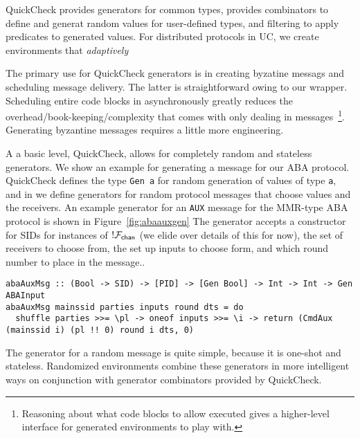QuickCheck provides generators for common types, provides combinators to define and generat random values for user-defined types, and filtering to apply predicates to generated values.
For distributed protocols in UC, we create environments that \emph{adaptively} 

The primary use for QuickCheck generators is in creating byzatine messags and scheduling message delivery.
The latter is straightforward owing to our wrapper. Scheduling entire code blocks in asynchronously greatly reduces the overhead/book-keeping/complexity that comes with only dealing in messages~\footnote{Reasoning about what code blocks to allow executed gives a higher-level interface for generated environments to play with.}.
Generating byzantine messages requires a little more engineering. 

A a basic level, QuickCheck, allows for completely random and stateless generators. We show an example for generating a message for our ABA protocol.
QuickCheck defines the type \texttt{Gen a} for random generation of values of type \texttt{a}, and in \us we define generators for random protocol messages that choose values and the receivers. 
An example generator for an \texttt{AUX} message for the MMR-type ABA protocol is shown in Figure~\ref{fig:abaauxgen}
The generator accepts a constructor for SIDs for instances of $!\mathcal{F}_{{\mathsf {chan}}}$ (we elide over details of this for now), the set of receivers to choose from, the set up inputs to choose form, and which round number to place in the message.. 
\begin{figure*}
\begin{lstlisting}
abaAuxMsg :: (Bool -> SID) -> [PID] -> [Gen Bool] -> Int -> Int -> Gen ABAInput
abaAuxMsg mainssid parties inputs round dts = do
  shuffle parties >>= \pl -> oneof inputs >>= \i -> return (CmdAux (mainssid i) (pl !! 0) round i dts, 0)
\end{lstlisting}
\caption{Generator for specfically AUX messages. AUX is a constructor of the type \texttt{ABAInput}.}
\label{fig:abaauxgen}
\end{figure*}
The generator for a random message is quite simple, because it is one-shot and stateless. 
Randomized environments combine these generators in more intelligent ways on conjunction with generator combinators provided by QuickCheck.

